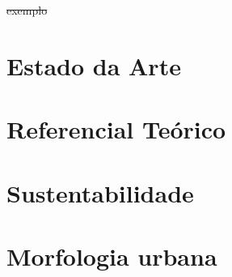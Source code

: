 \documentclass[]{report}
\begin{document}
				


			\sout{exemplo}
	\section{Estado da Arte}
	\section{Referencial Teórico}
	\section{Sustentabilidade}


\section{Morfologia urbana}
\end{document}
